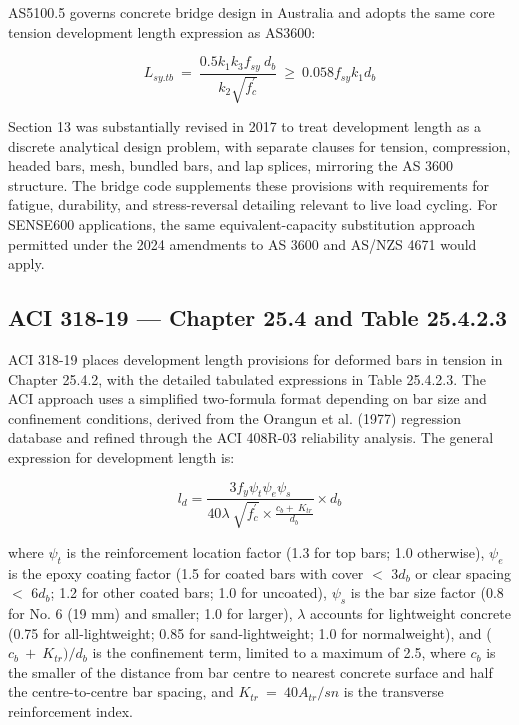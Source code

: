 AS5100.5 governs concrete bridge design in Australia and adopts the same core tension development length expression as AS3600:

\begin{equation}
    L_{sy.tb}\ =\ \frac{0.5 k_{1} k_{3} f_{sy}\ d_{b}}{k_{2} \sqrt{f_{c}^{\prime }}}\ \geq \ 0.058 f_{sy}k_{1}d_{b}
\end{equation}

Section 13 was substantially revised in 2017 to treat development length as a discrete analytical design problem, with separate clauses for tension, compression, headed bars, mesh, bundled bars, and lap splices, mirroring the AS 3600 structure. The bridge code supplements these provisions with requirements for fatigue, durability, and stress-reversal detailing relevant to live load cycling. For SENSE600 applications, the same equivalent-capacity substitution approach permitted under the 2024 amendments to AS 3600 and AS/NZS 4671 would apply.

\subsection{ACI 318-19 — Chapter 25.4 and Table 25.4.2.3}

ACI 318-19 places development length provisions for deformed bars in tension in Chapter 25.4.2, with the detailed tabulated expressions in Table 25.4.2.3. The ACI approach uses a simplified two-formula format depending on bar size and confinement conditions, derived from the Orangun et al. (1977) regression database and refined through the ACI 408R-03 reliability analysis. The general expression for development length is:

\begin{equation}
    l_{d}=\frac{3f_{y}{\psi }_{t}{\psi }_{e}{\psi }_{s}}{40\lambda \ \sqrt{f_{c}^{\prime }}\times \frac{c_{b}+\ K_{tr}}{d_{b}}} \times d_{b}
\end{equation}

where ${\psi }_{t}$ is the reinforcement location factor (1.3 for top bars; 1.0 otherwise), ${\psi }_{e}$ is the epoxy coating factor (1.5 for coated bars with cover $<$ 3$d_{b}$ or clear spacing $<$ 6$d_{b}$; 1.2 for other coated bars; 1.0 for uncoated), ${\psi }_{s}$ is the bar size factor (0.8 for No. 6 (19 mm) and smaller; 1.0 for larger), $\lambda$ accounts for lightweight concrete (0.75 for all-lightweight; 0.85 for sand-lightweight; 1.0 for normalweight), and ($c_{b}\ +\ K_{tr})/d_{b}$ is the confinement term, limited to a maximum of 2.5, where $c_{b}$ is the smaller of the distance from bar centre to nearest concrete surface and half the centre-to-centre bar spacing, and $K_{tr}\ =\ 40A_{tr}/sn$ is the transverse reinforcement index.

